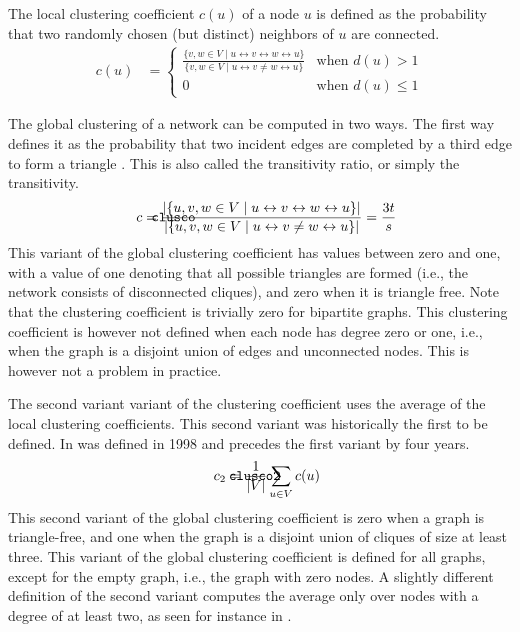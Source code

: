 \documentclass{article}
\def\mathnote#1{%
  \tag*{\rlap{\hspace\marginparsep\smash{\parbox[t]{\marginparwidth}{#1}}}}
}
\begin{document}
The local clustering coefficient $c(u)$ of a node $u$ is defined as the
probability that two randomly chosen (but distinct) neighbors of $u$ are
connected.
\begin{align}
  c(u) &= \left\{ \begin{array}{ll} \frac { \{ v, w \in V \mid u \leftrightarrow v
      \leftrightarrow w \leftrightarrow u \} } { \{ v, w \in V \mid u \leftrightarrow v \neq w \leftrightarrow u \}
    } & \text{when } d(u) > 1 \\ 0 & \text{when } d(u) \leq 1
          \end{array} \right. 
\end{align}

The global clustering of a network can be computed in two ways.  The
first way defines it as the probability that two incident edges are
completed by a third edge to form a triangle \citep{b736}. This is also
called the transitivity ratio, or simply the transitivity.
\begin{align}
  \mathnote{\texttt{clusco}} c &= 
  \frac {|\{ u, v, w \in V \mid u \leftrightarrow v \leftrightarrow w \leftrightarrow u \}|} 
        {|\{ u, v, w \in V \mid u \leftrightarrow v \neq w \leftrightarrow u \}|} 
        = \frac {3t} s
\end{align}
This variant of the global clustering coefficient has values between
zero and one, with a value of one denoting that all possible triangles
are formed (i.e., the network consists of disconnected cliques), and
zero when it is triangle free.  Note that the clustering coefficient is
trivially zero for bipartite graphs.  This clustering coefficient is
however not defined when each node has degree zero or one, i.e., when
the graph is a disjoint union of edges and unconnected nodes.  This is
however not a problem in practice.

The second variant variant of the clustering coefficient uses the
average of the local clustering coefficients. This second variant was
historically the first to be defined.  In was defined in
1998 \citep{b228} and precedes the first variant by four years.
\begin{align}
  \mathnote{\texttt{clusco2}} c_2 &= \frac 1 {|V|} \sum_{u \in V} c(u)
\end{align}
This second variant of the global clustering coefficient is zero when a
graph is triangle-free, and one when the graph is a disjoint union of
cliques of size at least three.  This variant of the global clustering
coefficient is defined for all graphs, except for the empty graph, i.e.,
the graph with zero nodes.  A slightly different definition of the
second variant computes the average only over nodes with a degree of at
least two, as seen for instance in \citep{b845}.
\end{document}

